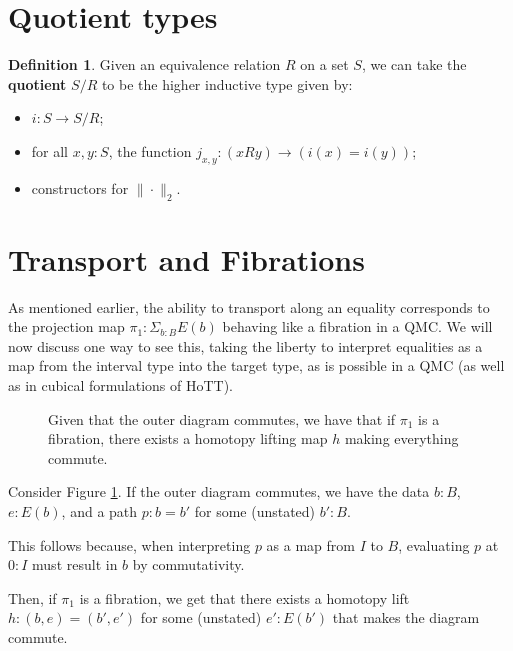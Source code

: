 \documentclass{amsart}
\theoremstyle{definition}
\newtheorem{defn}{Definition}[section]
\renewcommand{\emph}{\textbf}
\begin{document}
\section{Quotient types}

\begin{defn}
    Given an equivalence relation $R$ on a set $S$, we can take the \emph{quotient} $S/R$ to be the higher inductive type given by:
    \begin{itemize}
        \item $i: S\to S/R$;
        \item for all $x, y : S$, the function $j_{x,y} : (xRy) \to (i(x) = i(y))$;
        \item constructors for $\| \cdot \|_2$.
    \end{itemize}
\end{defn}




\appendix

\section{Transport and Fibrations}
\label{sec:transport-explanation}

As mentioned earlier, the ability to transport along an equality corresponds to the projection map $\pi_1 : \Sigma_{b : B} E(b)$ behaving like a fibration in a QMC. We will now discuss one way to see this, taking the liberty to interpret equalities as a map from the interval type into the target type, as is possible in a QMC (as well as in cubical formulations of HoTT).

\begin{figure}[h]
    \centering
    
    \caption{Given that the outer diagram commutes, we have that if $\pi_1$ is a fibration, there exists a homotopy lifting map $h$ making everything commute.}
    \label{fig:transport-as-fibration}
\end{figure}

Consider Figure \ref{fig:transport-as-fibration}. If the outer diagram commutes, we have the data $b : B$, $e : E(b)$, and a path $p : b = b'$ for some (unstated) $b' : B$.

This follows because, when interpreting $p$ as a map from $I$ to $B$, evaluating $p$ at $0 : I$ must result in $b$ by commutativity.

Then, if $\pi_1$ is a fibration, we get that there exists a homotopy lift $h : (b, e) = (b', e')$ for some (unstated) $e' : E(b')$ that makes the diagram commute.
\end{document}

